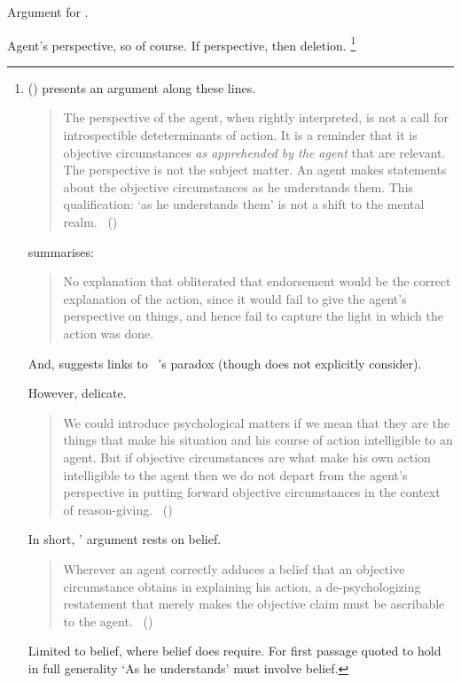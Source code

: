 \begin{note}
  Argument for \ptivity{}.

  Agent's perspective, so of course.
  If perspective, then deletion.%
  \footnote{
    \citeauthor{Collins:1997wn} (\citeyear{Collins:1997wn}) presents an argument along these lines.
    \begin{quote}
      The perspective of the agent, when rightly interpreted, is not a call for introspectible deteterminants of action.
      It is a reminder that it is objective circumstances \emph{as apprehended by the agent} that are relevant.
      The perspective is not the subject matter.
      An agent makes statements about the objective circumstances as he understands them.
      This qualification: `as he understands them' is not a shift to the mental realm.%
      \mbox{ }\hfill\mbox{(\citeyear[120]{Collins:1997wn})}
    \end{quote}

    \citeauthor{Dancy:2000aa} summarises:
    \begin{quote}
      No explanation that obliterated that endorsement would be the correct explanation of the action, since it would fail to give the agent’s perspective on things, and hence fail to capture the light in which the action was done.
      \citeyear[108]{Dancy:2000aa}
    \end{quote}

    And, \citeauthor{Dancy:2000aa} suggests links to ~\citeauthor{Moore:1993wk}'s paradox (though \citeauthor{Collins:1997wn} does not explicitly consider).

    However, delicate.
    \begin{quote}
      We could introduce psychological matters if we mean that they are the things that make his situation and his course of action intelligible to an agent.
      But if objective circumstances are what make his own action intelligible to the agent then we do not depart from the agent’s perspective in putting forward objective circumstances in the context of reason-giving.%
      \mbox{ }\hfill\mbox{(\citeyear[120]{Collins:1997wn})}
    \end{quote}
    In short, \citeauthor{Collins:1997wn}' argument rests on belief.
    \begin{quote}
      Wherever an agent correctly adduces a belief that an objective circumstance obtains in explaining his action, a de-psychologizing restatement that merely makes the objective claim must be ascribable to the agent.%
      \mbox{ }\hfill\mbox{(\citeyear[120]{Collins:1997wn})}
    \end{quote}
    Limited to belief, where belief does require.
    For first passage quoted to hold in full generality `As he understands' must involve belief.

}
\end{note}
